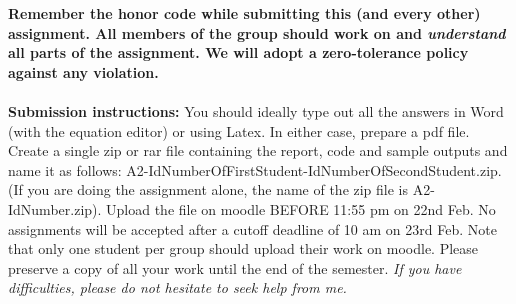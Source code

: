 \documentclass[11pt]{article}
\begin{document}
\maketitle

\textbf{Remember the honor code while submitting this (and every other) assignment. All members of the group should work on and \emph{understand} all parts of the assignment. We will adopt a \textbf{zero-tolerance policy} against any violation.}
\\
\\
\textbf{Submission instructions:} You should ideally type out all the answers in Word (with the equation editor) or using Latex. In either case, prepare a pdf file. Create a single zip or rar file containing the report, code and sample outputs and name it as follows: A2-IdNumberOfFirstStudent-IdNumberOfSecondStudent.zip. (If you are doing the assignment alone, the name of the zip file is A2-IdNumber.zip). Upload the file on moodle BEFORE 11:55 pm on 22nd Feb. No assignments will be accepted after a cutoff deadline of 10 am on 23rd Feb. Note that only one student per group should upload their work on moodle. Please preserve a copy of all your work until the end of the semester. \emph{If you have difficulties, please do not hesitate to seek help from me.} 
\end{document}
